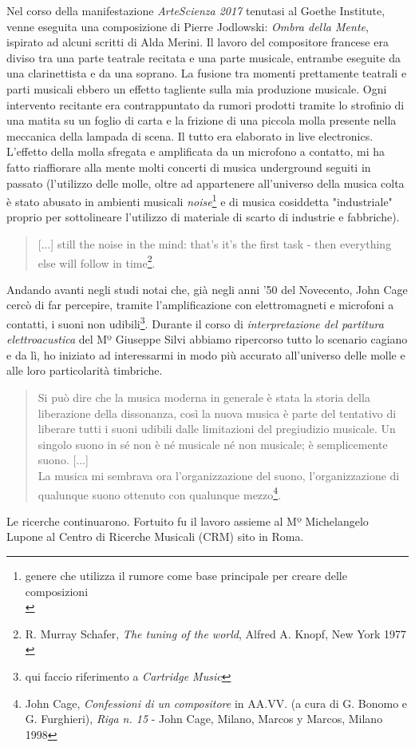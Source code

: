 Nel corso della manifestazione \textit{ArteScienza 2017} tenutasi al Goethe Institute, venne eseguita una composizione di Pierre Jodlowski: \textit{Ombra della Mente}, ispirato ad alcuni scritti di Alda Merini. Il lavoro del compositore francese era diviso tra una parte teatrale recitata e una parte musicale, entrambe eseguite da una clarinettista e da una soprano. La fusione tra momenti prettamente teatrali e parti musicali ebbero un effetto tagliente sulla mia produzione musicale. Ogni intervento recitante era contrappuntato da rumori prodotti tramite lo strofinio di una matita su un foglio di carta e la frizione di una piccola molla presente nella meccanica della lampada di scena. Il tutto era elaborato in live electronics. L'effetto della molla sfregata e amplificata da un microfono a contatto, mi ha fatto riaffiorare alla mente molti concerti di musica underground seguiti in passato (l'utilizzo delle molle, oltre ad appartenere all'universo della musica colta è stato abusato in ambienti musicali \textit{noise}\footnote{genere che utilizza il rumore come base principale per creare delle composizioni \\} e di musica cosiddetta "industriale" proprio per sottolineare l'utilizzo di materiale di scarto di industrie e fabbriche).
\begin{quotation}
[...] still the noise in the mind: that's it's the first task - then everything else will follow in time\footnote{R. Murray Schafer, \textit{The tuning of the world}, Alfred A. Knopf, New York 1977 \\}.
\end{quotation}
Andando avanti negli studi notai che, già negli anni '50 del Novecento, John Cage cercò di far percepire, tramite l'amplificazione con elettromagneti e microfoni a contatti, i suoni non udibili\footnote{qui faccio riferimento a \textit{Cartridge Music}}. Durante il corso di \textit{interpretazione del partitura elettroacustica} del Mº Giuseppe Silvi abbiamo ripercorso tutto lo scenario cagiano e da lì, ho iniziato ad interessarmi in modo più accurato all'universo delle molle e alle loro particolarità timbriche.
\begin{small}
\begin{quotation}
Si può dire che la musica moderna in generale è stata la storia della liberazione della dissonanza, così la nuova musica è parte del tentativo di liberare tutti i suoni udibili dalle limitazioni del pregiudizio musicale.
Un singolo suono in sé non è né musicale né non musicale; è semplicemente suono. [...] \\
La musica mi sembrava ora l'organizzazione del suono, l'organizzazione di qualunque suono ottenuto con qualunque mezzo\footnote{John Cage, \textit{Confessioni di un compositore} in AA.VV. (a cura di G. Bonomo e G. Furghieri), \textit{Riga n. 15} - John Cage, Milano, Marcos y Marcos, Milano 1998}.
\end{quotation}
\end{small}
Le ricerche continuarono. Fortuito fu il lavoro assieme al Mº Michelangelo Lupone al Centro di Ricerche Musicali (CRM) sito in Roma.


